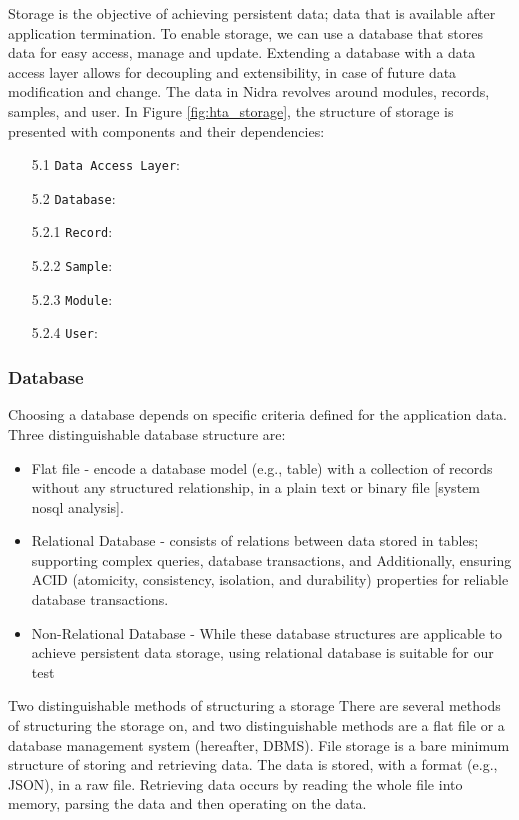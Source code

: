 Storage is the objective of achieving persistent data; data that is available after application termination. To enable storage, we can use a database that stores data for easy access, manage and update. Extending a database with a data access layer allows for decoupling and extensibility, in case of future data modification and change. The data in Nidra revolves around modules, records, samples, and user. In Figure \ref{fig:hta_storage}, the structure of storage is presented with components and their dependencies: 

\begin{itemize}
    \item[5.1] \verb|Data Access Layer|: 
    \item[5.2] \verb|Database|: 
    \item[5.2.1] \verb|Record|: 
    \item[5.2.2] \verb|Sample|: 
    \item[5.2.3] \verb|Module|: 
    \item[5.2.4] \verb|User|: 
\end{itemize}

\subsubsection{Database}

\noindent Choosing a database depends on specific criteria defined for the application data. Three distinguishable database structure are: 
\begin{itemize}
    \item Flat file - encode a database model (e.g., table) with a collection of records without any structured relationship, in a plain text or binary file [system nosql analysis]. 
    \item Relational Database - consists of relations between data stored in tables; supporting complex queries, database transactions, and   Additionally, ensuring ACID (atomicity, consistency, isolation, and durability) properties for reliable database transactions. 
    \item Non-Relational Database - While these database structures are applicable to achieve persistent data storage, using relational database is suitable for our test
\end{itemize}

Two distinguishable methods of structuring a storage 
There are several methods of structuring the storage on, and two distinguishable methods are a flat file or a database management system (hereafter, DBMS). File storage is a bare minimum structure of storing and retrieving data. The data is stored, with a format (e.g., JSON), in a raw file. Retrieving data occurs by reading the whole file into memory, parsing the data and then operating on the data.


